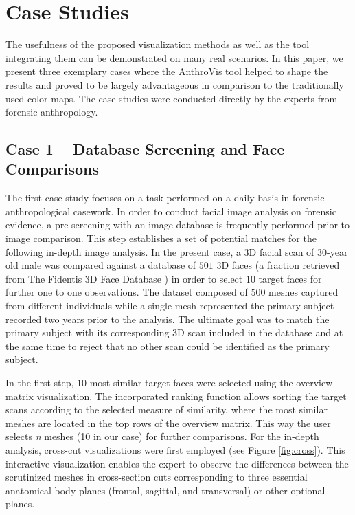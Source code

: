 \documentclass[final,5p,times]{elsarticle}
\begin{document}
\section{Case Studies} \label{results}
The usefulness of the proposed visualization methods as well as the tool integrating them can be demonstrated on many real scenarios.
In this paper, we present three exemplary cases where the AnthroVis tool helped to shape the results and proved to be largely advantageous in comparison to the traditionally used color maps.
The case studies were conducted directly by the experts from forensic anthropology.

\subsection{Case 1 -- Database Screening and Face Comparisons}
The first case study focuses on a task performed on a daily basis in forensic anthropological casework. 
In order to conduct facial image analysis on forensic evidence, a pre-screening with an image database is frequently performed prior to image comparison. 
This step establishes a set of potential matches for the following in-depth image analysis.
In the present case, a 3D facial scan of $30$-year old male was compared against a database of $501$ 3D faces (a fraction retrieved from The Fidentis 3D Face Database \cite{F3DFD}) in order to select $10$ target faces for further one to one observations.
The dataset composed of $500$ meshes captured from different individuals while a single mesh represented the primary subject recorded two years prior to the analysis. The ultimate goal was to match the primary subject with its corresponding 3D scan included in the database and at the same time to reject that no other scan could be identified as the primary subject. 

In the first step, $10$ most similar target faces were selected using the overview matrix visualization.
The incorporated ranking function allows sorting the target scans according to the selected measure of similarity, where the most similar meshes are located in the top rows of the overview matrix. 
This way the user selects \textit{n} meshes (10 in our case) for further comparisons. 
For the in-depth analysis, cross-cut visualizations were first employed (see Figure \ref{fig:cross}).
This interactive visualization enables the expert to observe the differences between the scrutinized meshes in cross-section cuts corresponding to three essential anatomical body planes (frontal, sagittal, and transversal) or other optional planes. 
\end{document}
